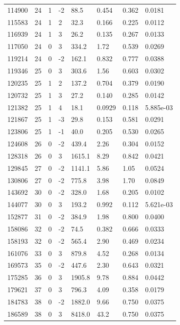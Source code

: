 \documentclass[preview]{standalone}
\begin{document}
{{{{{\begin{tabular}{L{1.2cm}C{1.2cm} C{0.3cm}C{0.5cm} C{1.4cm}C{1.4cm} C{1.4cm}C{1.4cm}}
  114900  &    24  & 1     & -2 &  88.5  & 0.454  & 0.362 &  0.0181   \\ 
  115583  &    24  & 1     &  2 &  32.3  & 0.166  & 0.225 &  0.0112   \\ 
  116939  &    24  & 1     &  3 &  26.2  & 0.135  & 0.267 &  0.0133   \\ 
  117050  &    24  & 0     &  3 &  334.2  & 1.72  & 0.539 &  0.0269   \\ 
  119214  &    24  & 0     & -2 &  162.1  & 0.832  & 0.777 &  0.0388   \\ 
  119346  &    25  & 0     &  3 &  303.6  & 1.56  & 0.603 &  0.0302   \\ 
  120235  &    25  & 1     &  2 &  137.2  & 0.704  & 0.379 &  0.0190   \\ 
  120732  &    25  & 1     &  3 &  27.2  & 0.140  & 0.285 &  0.0142   \\ 
  121382  &    25  & 1     &  4 &  18.1  & 0.0929  & 0.118 &  5.885e-03   \\ 
  121867  &    25  & 1     & -3 &  29.8  & 0.153  & 0.581 &  0.0291   \\ 
  123806  &    25  & 1     & -1 &  40.0  & 0.205  & 0.530 &  0.0265   \\ 
  124608  &    26  & 0     & -2 &  439.4  & 2.26  & 0.304 &  0.0152   \\ 
  128318  &    26  & 0     &  3 &  1615.1  & 8.29  & 0.842 &  0.0421   \\ 
  129845  &    27  & 0     & -2 &  1141.1  & 5.86  & 1.05 &  0.0524   \\ 
  130806  &    27  & 0     & -2 &  775.8  & 3.98  & 1.70 &  0.0849   \\ 
  143692  &    30  & 0     & -2 &  328.0  & 1.68  & 0.205 &  0.0102   \\ 
  144077  &    30  & 0     &  3 &  193.2  & 0.992  & 0.112 &  5.621e-03   \\ 
  152877  &    31  & 0     & -2 &  384.9  & 1.98  & 0.800 &  0.0400   \\ 
  158086  &    32  & 0     & -2 &  74.5  & 0.382  & 0.666 &  0.0333   \\ 
  158193  &    32  & 0     & -2 &  565.4  & 2.90  & 0.469 &  0.0234   \\ 
  161076  &    33  & 0     &  3 &  879.8  & 4.52  & 0.268 &  0.0134   \\ 
  169573  &    35  & 0     & -2 &  447.6  & 2.30  & 0.643 &  0.0321   \\ 
  175285  &    36  & 0     &  3 &  1905.8  & 9.78  & 0.884 &  0.0442   \\ 
  179621  &    37  & 0     &  3 &  796.3  & 4.09  & 0.358 &  0.0179   \\ 
  184783  &    38  & 0     & -2 &  1882.0  & 9.66  & 0.750 &  0.0375   \\ 
  186589  &    38  & 0     &  3 &  8418.0  & 43.2  & 0.750 &  0.0375   \\ 
\hline 
\end{tabular} 

}}}}}
\end{document}
